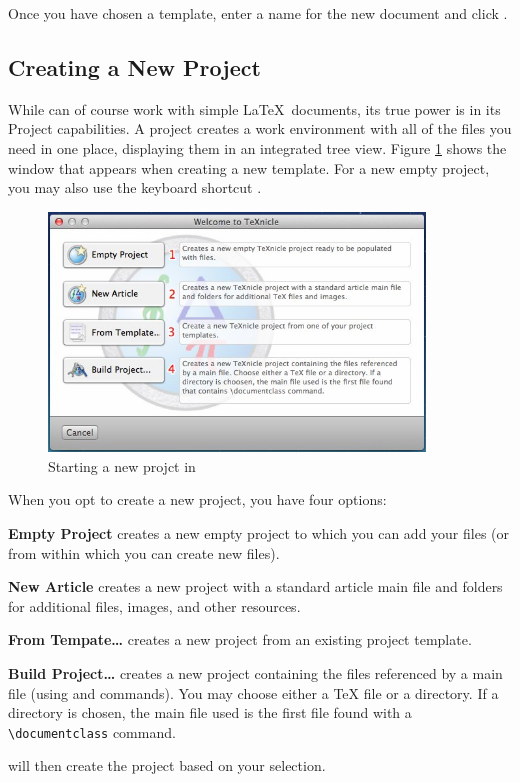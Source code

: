 Once you have chosen a template, enter a name for the new document and click .

\subsection[Creating a New Project]{Creating a New \texnicle Project}
\label{userguide.newproject}
While \texnicle can of course work with simple \LaTeX\ documents, its true power is in its Project capabilities. A project creates a work environment with all of the files you need in one place, displaying them in an integrated tree view. Figure \ref{fig:texnicle-newproject} shows the window that appears when creating a new template. For a new empty project, you may also use the keyboard shortcut .
\begin{figure}[htbp]
\centering
\label{fig:texnicle-newproject}
\caption{Starting a new projct in \texnicle}
\includegraphics[width=10cm]{TeXnicle-Images/texnicle-newproject.jpg}
\end{figure}

When you opt to create a new project, you have four options:
\begin{enumerate*}
		\item \textbf{Empty Project} creates a new empty \texnicle project to which you can add your files (or from within which you can create new files).
		\item \textbf{New Article} creates a new \texnicle project with a standard article main file and folders for additional files, images, and other resources.
		\item \textbf{From Tempate\ldots} creates a new \texnicle project from an existing project template.
		\item \textbf{Build Project\ldots} creates a new \texnicle project containing the files referenced by a main file (using \verb|| and \verb|| commands). You may choose either a {\TeX} file or a directory. If a directory is chosen, the main file used is the first file found with a \verb|\documentclass| command.
\end{enumerate*}

\texnicle will then create the project based on your selection.